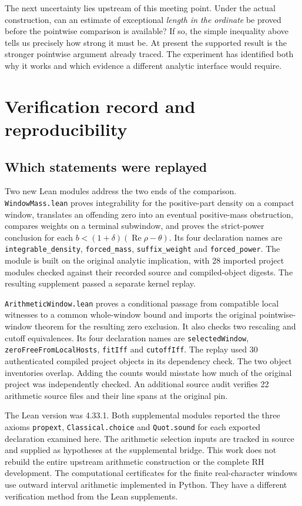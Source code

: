 \documentclass[12pt,letterpaper]{article}
\begin{document}
The next uncertainty lies upstream of this meeting point. Under the actual construction, can an estimate of exceptional \emph{length in the ordinate} be proved before the pointwise comparison is available? If so, the simple inequality above tells us precisely how strong it must be. At present the supported result is the stronger pointwise argument already traced. The experiment has identified both why it works and which evidence a different analytic interface would require.



\appendix
\section{Verification record and reproducibility}
\subsection{Which statements were replayed}
Two new Lean modules address the two ends of the comparison. \texttt{WindowMass.lean} proves integrability for the positive-part density on a compact window, translates an offending zero into an eventual positive-mass obstruction, compares weights on a terminal subwindow, and proves the strict-power conclusion for each \(b<(1+\delta)(\operatorname{Re}\rho-\theta)\). Its four declaration names are \texttt{integrable\_density}, \texttt{forced\_mass}, \texttt{suffix\_weight} and \texttt{forced\_power}. The module is built on the original analytic implication, with 28 imported project modules checked against their recorded source and compiled-object digests. The resulting supplement passed a separate kernel replay.

\texttt{ArithmeticWindow.lean} proves a conditional passage from compatible local witnesses to a common whole-window bound and imports the original pointwise-window theorem for the resulting zero exclusion. It also checks two rescaling and cutoff equivalences. Its four declaration names are \texttt{selectedWindow}, \texttt{zeroFreeFromLocalHosts}, \texttt{fitIff} and \texttt{cutoffIff}. The replay used 30 authenticated compiled project objects in its dependency check. The two object inventories overlap. Adding the counts would misstate how much of the original project was independently checked. An additional source audit verifies 22 arithmetic source files and their line spans at the original pin.

The Lean version was 4.33.1. Both supplemental modules reported the three axioms \texttt{propext}, \texttt{Classical.choice} and \texttt{Quot.sound} for each exported declaration examined here. The arithmetic selection inputs are tracked in source and supplied as hypotheses at the supplemental bridge. This work does not rebuild the entire upstream arithmetic construction or the complete RH development. The computational certificates for the finite real-character windows use outward interval arithmetic implemented in Python. They have a different verification method from the Lean supplements.
\end{document}
